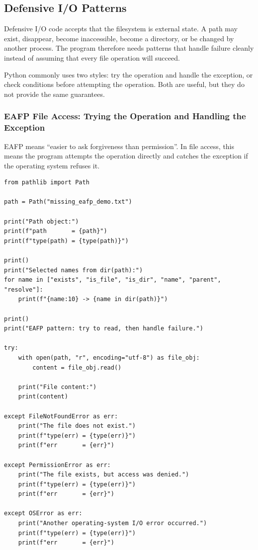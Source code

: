 \subsection{Defensive I/O Patterns}

Defensive I/O code accepts that the filesystem is external state. A path may exist, disappear, become inaccessible, become a directory, or be changed by another process. The program therefore needs patterns that handle failure cleanly instead of assuming that every file operation will succeed.

Python commonly uses two styles: try the operation and handle the exception, or check conditions before attempting the operation. Both are useful, but they do not provide the same guarantees.

\subsubsection{EAFP File Access: Trying the Operation and Handling the Exception}

EAFP means ``easier to ask forgiveness than permission''. In file access, this means the program attempts the operation directly and catches the exception if the operating system refuses it.

\begin{verbatim}
from pathlib import Path

path = Path("missing_eafp_demo.txt")

print("Path object:")
print(f"path       = {path}")
print(f"type(path) = {type(path)}")

print()
print("Selected names from dir(path):")
for name in ["exists", "is_file", "is_dir", "name", "parent", "resolve"]:
    print(f"{name:10} -> {name in dir(path)}")

print()
print("EAFP pattern: try to read, then handle failure.")

try:
    with open(path, "r", encoding="utf-8") as file_obj:
        content = file_obj.read()

    print("File content:")
    print(content)

except FileNotFoundError as err:
    print("The file does not exist.")
    print(f"type(err) = {type(err)}")
    print(f"err       = {err}")

except PermissionError as err:
    print("The file exists, but access was denied.")
    print(f"type(err) = {type(err)}")
    print(f"err       = {err}")

except OSError as err:
    print("Another operating-system I/O error occurred.")
    print(f"type(err) = {type(err)}")
    print(f"err       = {err}")
\end{verbatim}

